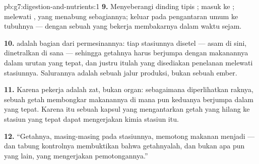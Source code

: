 \begin{solution}{pb:g7:digestion-and-nutrients:1}
\textbf{9.} Menyeberangi dinding tipis ; masuk ke
; melewati , yang menabung sebagiannya; keluar pada
pengantaran umum ke  tubuhnya --- dengan sebuah  yang bekerja
membakarnya dalam waktu sejam.

\textbf{10.}  adalah bagian dari permesinannya: tiap
stasiunnya disetel --- asam di sini, dinetralkan di sana --- sehingga
getahnya harus berjumpa dengan makanannya dalam urutan yang tepat, dan
justru itulah yang disediakan penelanan melewati stasiunnya. Salurannya
adalah sebuah jalur produksi, bukan sebuah ember.

\textbf{11.} Karena pekerja  adalah zat, bukan organ:
sebagaimana diperlihatkan raknya, sebuah getah membongkar makanannya
di mana pun keduanya berjumpa dalam  yang tepat. Karena itu
sebuah kapsul yang mengantarkan getah yang hilang ke stasiun yang
tepat dapat mengerjakan kimia stasiun itu.

\textbf{12.} ``Getahnya, masing-masing pada stasiunnya, memotong
makanan menjadi  --- dan tabung kontrolnya membuktikan bahwa
getahnyalah, dan bukan apa pun yang lain, yang mengerjakan
pemotongannya.''
\end{solution}
